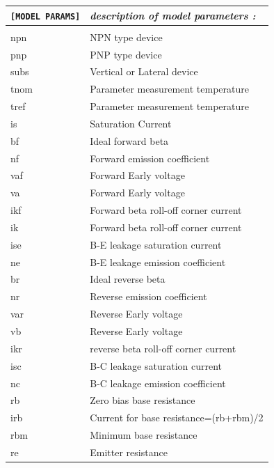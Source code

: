 \begin{longtable}{l l}		
\texttt{[MODEL PARAMS]} & \textit{description of model parameters :} \\ \hline \\ \vspace{-0.8\parskip}
{\small npn} & {\small NPN type device} \\
{\small pnp} & {\small PNP type device} \\
{\small subs} & {\small Vertical or Lateral device} \\
{\small tnom} & {\small Parameter measurement temperature} \\
{\small tref} & {\small Parameter measurement temperature} \\
{\small is} & {\small Saturation Current} \\
{\small bf} & {\small Ideal forward beta} \\
{\small nf} & {\small Forward emission coefficient} \\
{\small vaf} & {\small Forward Early voltage} \\
{\small va} & {\small Forward Early voltage} \\
{\small ikf} & {\small Forward beta roll-off corner current} \\
{\small ik} & {\small Forward beta roll-off corner current} \\
{\small ise} & {\small B-E leakage saturation current} \\
{\small ne} & {\small B-E leakage emission coefficient} \\
{\small br} & {\small Ideal reverse beta} \\
{\small nr} & {\small Reverse emission coefficient} \\
{\small var} & {\small Reverse Early voltage} \\
{\small vb} & {\small Reverse Early voltage} \\
{\small ikr} & {\small reverse beta roll-off corner current} \\
{\small isc} & {\small B-C leakage saturation current} \\
{\small nc} & {\small B-C leakage emission coefficient} \\
{\small rb} & {\small Zero bias base resistance} \\
{\small irb} & {\small Current for base resistance=(rb+rbm)/2} \\
{\small rbm} & {\small Minimum base resistance} \\
{\small re} & {\small Emitter resistance} \\

\end{longtable}
